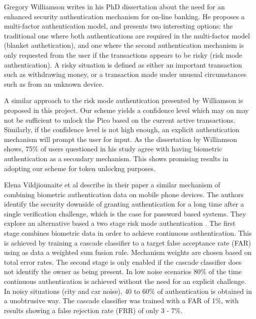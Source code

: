 Gregory Williamson writes in his PhD dissertation \cite{williamson2006enhanced} about the need for an enhanced security authentication mechanism for on-line banking. He proposes a multi-factor authentication model, and presents two interesting options: the traditional one where both authentications are required in the multi-factor model (blanket authetication), and one where the second authentication mechanism is only requested from the user if the transactions appears to be risky (risk mode authentication). A risky situation is defined as either an important transaction such as withdrawing money, or a transaction made under unusual circumstances such as from an unknown device. 

A similar approach to the risk mode authentication presented by Williamson \cite{williamson2006enhanced} is proposed in this project. Our scheme yields a confidence level which may on may not be sufficient to unlock the Pico based on the current active transactions. Similarly, if the confidence level is not high enough, an explicit authentication mechanism will prompt the user for input. As the dissertation by Williamson shows, 75\% of users questioned in his study agree with having biometric authentication as a secondary mechanism. This shows promising results in adopting our scheme for token unlockng purposes.

Elena Vildjiounaite et al describe in their paper \cite{vildjiounaite2007increasing} a similar mechanism of combining biometric authentication data on mobile phone devices. The authors identify the security downside of granting authentication for a long time after a single verification challenge, which is the case for password based systems. They explore an alternative based a two stage risk mode authentication \cite{williamson2006enhanced}. The first stage combines biometric data in order to achieve continuous authentication. This is achieved by training a cascade classifier to a target false acceptance rate (FAR) using as data a weighted sum fusion rule. Mechanism weights are chosen based on total error rates. The second stage is only enabled if the cascade classifier does not identify the owner as being present. In low noise scenarios 80\% of the time continuous authentication is achieved without the need for an explicit challenge. In noisy situations (city and car noise), 40 to 60\% of authentication is obtained in a unobtrusive way. The cascade classifier was trained with a FAR of 1\%, with results showing a false rejection rate (FRR) of only 3 - 7\%.

